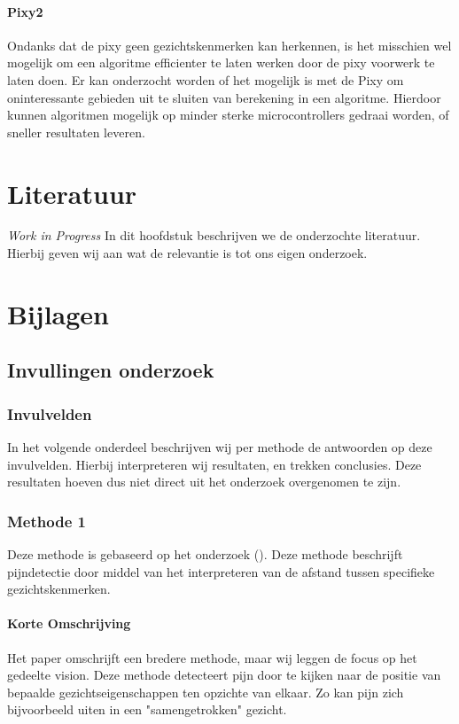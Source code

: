 \documentclass[11pt]{article}
\begin{document}
    \paragraph{Pixy2}
    Ondanks dat de pixy geen gezichtskenmerken kan herkennen, is het misschien wel mogelijk om een algoritme efficienter te laten werken door de pixy voorwerk te laten doen.
    Er kan onderzocht worden of het mogelijk is met de Pixy om oninteressante gebieden uit te sluiten van berekening in een algoritme.
    Hierdoor kunnen algoritmen mogelijk op minder sterke microcontrollers gedraai worden, of sneller resultaten leveren.


    \section{Literatuur}\label{sec:literatuur2}
    \emph{Work in Progress}
    In dit hoofdstuk beschrijven we de onderzochte literatuur.
    Hierbij geven wij aan wat de relevantie is tot ons eigen onderzoek.


    \section{Bijlagen}\label{sec:bijlagen}

    \subsection{Invullingen onderzoek}\label{subsec:invullingen-onderzoek}

    \subsubsection{Invulvelden}
    In het volgende onderdeel beschrijven wij per methode de antwoorden op deze invulvelden.
    Hierbij interpreteren wij resultaten, en trekken conclusies.
    Deze resultaten hoeven dus niet direct uit het onderzoek overgenomen te zijn.

    \subsubsection{Methode 1}
    Deze methode is gebaseerd op het onderzoek (\citet{werner2014automatic}).
    Deze methode beschrijft pijndetectie door middel van het interpreteren van de afstand tussen specifieke gezichtskenmerken.

    \paragraph{Korte Omschrijving}
    Het paper omschrijft een bredere methode, maar wij leggen de focus op het gedeelte vision.
    Deze methode detecteert pijn door te kijken naar de positie van bepaalde gezichtseigenschappen ten opzichte van elkaar.
    Zo kan pijn zich bijvoorbeeld uiten in een "samengetrokken" gezicht.
\end{document}
